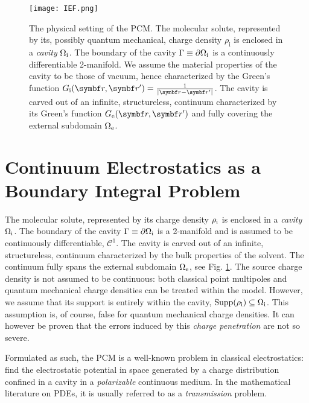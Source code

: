 \begin{figure}[!h]
  \centering
  \texttt{[image: IEF.png]}
  \caption[The physical setting of the polarizable continuum model.]{
  The physical setting of the \gls{PCM}. The molecular solute,
  represented by its, possibly quantum mechanical, charge density
  $\rho_\mathrm{i}$ is enclosed in a \emph{cavity} $\Omega_\mathrm{i}$.
  The boundary of the cavity $\Gamma\equiv\partial\Omega_\mathrm{i}$ is a
  continuously differentiable 2-manifold.
  We assume the material properties of the cavity to be those of vacuum,
  hence characterized by the Green's function
  $\Gi=\frac{1}{|\vect{r}-\vect{r}^\prime|}$.
  The cavity is carved out of an infinite, structureless, continuum
  characterized by its Green's function $\Ge$ and fully covering the
  external subdomain $\Omega_\mathrm{e}$.
  }
  \label{fig:IEF}
\end{figure}

\section{Continuum Electrostatics as a Boundary Integral Problem}\label{sec:IEF}

The molecular solute, represented by its charge density
$\rho_\mathrm{i}$ is enclosed in a \emph{cavity} $\Omega_\mathrm{i}$.
The boundary of the cavity $\Gamma\equiv\partial\Omega_\mathrm{i}$ is a
2-manifold and is assumed to be continuously differentiable, \ie $\mathcal{C}^1$.
The cavity is carved out of an infinite, structureless, continuum
characterized by the bulk properties of the solvent.
The continuum fully spans the external subdomain $\Omega_\mathrm{e}$, see Fig. \ref{fig:IEF}.
The source charge density is not assumed to be continuous: both
classical point multipoles and quantum mechanical charge densities can
be treated within the model.
However, we assume that its support is entirely within the cavity,
$\mathop{}\!\mathrm{Supp}(\rho_\mathrm{i}) \subseteq \Omega_\mathrm{i}$. This assumption is, of course, false
for quantum mechanical charge densities. It can however be proven that
the errors induced by this \emph{charge penetration} are not so
severe.\autocite{Chipman2000-us, Cances2001-qs, Cances2001-qn}

Formulated as such, the \gls*{PCM} is a well-known problem in classical
electrostatics: find the electrostatic potential in space generated by
a charge distribution confined in a cavity in a \emph{polarizable}
continuous medium.\autocite{Jackson1999, Vanderlinde2005-gf}
In the mathematical literature on \acp{PDE}, it is usually referred to as a
\emph{transmission} problem.\autocite{Hackbusch1995-uq, Sauter2011-an}

